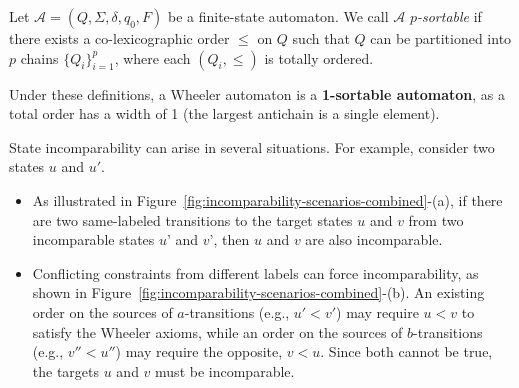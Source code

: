 \begin{definition} \label{def:p-sorable-automaton}
    Let $\mathcal{A} = (Q, \Sigma, \delta, q_0, F)$ be a finite-state automaton. We call $\mathcal{A}$ \emph{$p$-sortable} if there exists a co-lexicographic order $\leq$ on $Q$ such that $Q$ can be partitioned into $p$ chains $\{Q_i\}_{i=1}^p$, where each $(Q_i, \leq)$ is totally ordered.
\end{definition}

Under these definitions, a Wheeler automaton is a \textbf{1-sortable automaton}, as a total order has a width of 1 (the largest antichain is a single element).

\begin{example} \label{ex:incomparability}
    State incomparability can arise in several situations. For example, consider two states $u$ and $u'$.
    \begin{itemize}
        \item As illustrated in Figure~\ref{fig:incomparability-scenarios-combined}-(a), if there are two same-labeled transitions to the target states $u$ and $v$ from two incomparable states $u’$ and $v’$, then $u$ and $v$ are also incomparable.
        \item Conflicting constraints from different labels can force incomparability, as shown in Figure~\ref{fig:incomparability-scenarios-combined}-(b). An existing order on the sources of $a$-transitions (e.g., $u' < v'$) may require $u < v$ to satisfy the Wheeler axioms, while an order on the sources of $b$-transitions (e.g., $v'' < u''$) may require the opposite, $v < u$. Since both cannot be true, the targets $u$ and $v$ must be incomparable.
    \end{itemize}

    \begin{figure}[H]
    \centering
    \begin{subfigure}[b]{0.4\textwidth}
        \centering
\end{subfigure}
\end{figure}
\end{example}
